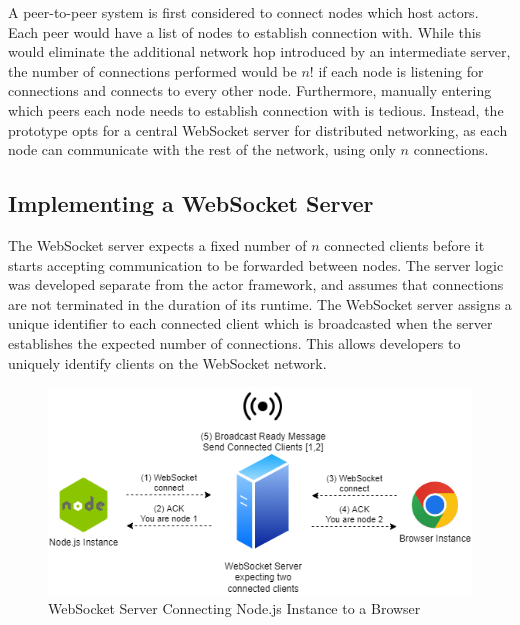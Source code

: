 \documentclass[oneside]{um-fict}
\begin{document}
A peer-to-peer system is first considered to connect nodes which host actors. Each peer would have a list of nodes to establish connection with. While this would eliminate the additional network hop introduced by an intermediate server, the number of connections performed would be $n!$ if each node is listening for connections and connects to every other node. Furthermore, manually entering which peers each node needs to establish connection with is tedious. Instead, the prototype opts for a central WebSocket server for distributed networking, as each node can communicate with the rest of the network, using only $n$ connections.

\subsection{Implementing a WebSocket Server}
The WebSocket server expects a fixed number of $n$ connected clients before it starts accepting communication to be forwarded between nodes. The server logic was developed separate from the actor framework, and assumes that connections are not terminated in the duration of its runtime. The WebSocket server assigns a unique identifier to each connected client which is broadcasted when the server establishes the expected number of connections. This allows developers to uniquely identify clients on the WebSocket network.

\begin{figure}[H]
    \begin{centering}
        \includegraphics[width=\textwidth]{resources/websocketconnection.png}
        \caption{WebSocket Server Connecting Node.js Instance to a Browser}\label{fig:websocketconnection}
    \end{centering}
\end{figure}
 
\end{document}
